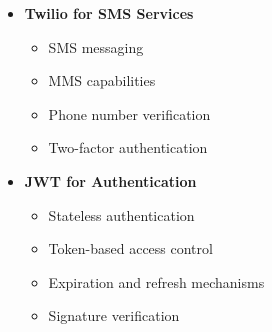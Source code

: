 \documentclass[12pt,a4paper]{article}
\begin{document}
\begin{multicols}{2}
\begin{itemize}
    \item \textbf{Twilio for SMS Services}
    \begin{itemize}
        \item SMS messaging
        \item MMS capabilities
        \item Phone number verification
        \item Two-factor authentication
    \end{itemize}
    
    \item \textbf{JWT for Authentication}
    \begin{itemize}
        \item Stateless authentication
        \item Token-based access control
        \item Expiration and refresh mechanisms
        \item Signature verification
    \end{itemize}
\end{itemize}
\end{multicols}
\end{document}
